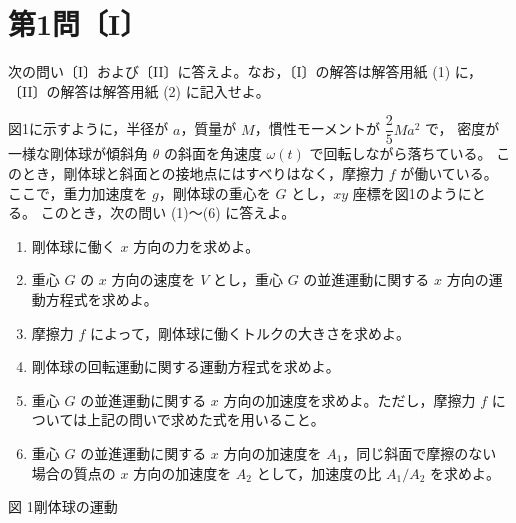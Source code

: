 \section*{第1問〔I〕}

次の問い〔I〕および〔II〕に答えよ。なお，〔I〕の解答は解答用紙 (1) に，
〔II〕の解答は解答用紙 (2) に記入せよ。

\medskip
図1に示すように，半径が $a$，質量が $M$，慣性モーメントが $\dfrac{2}{5}Ma^2$ で，
密度が一様な剛体球が傾斜角 $\theta$ の斜面を角速度 $\omega(t)$ で回転しながら落ちている。
このとき，剛体球と斜面との接地点にはすべりはなく，摩擦力 $f$ が働いている。
ここで，重力加速度を $g$，剛体球の重心を $G$ とし，$xy$ 座標を図1のようにとる。
このとき，次の問い (1)〜(6) に答えよ。

\begin{enumerate}[label=(\arabic*)]
  \item 剛体球に働く $x$ 方向の力を求めよ。
  \item 重心 $G$ の $x$ 方向の速度を $V$ とし，重心 $G$ の並進運動に関する
        $x$ 方向の運動方程式を求めよ。
  \item 摩擦力 $f$ によって，剛体球に働くトルクの大きさを求めよ。
  \item 剛体球の回転運動に関する運動方程式を求めよ。
  \item 重心 $G$ の並進運動に関する $x$ 方向の加速度を求めよ。ただし，摩擦力 $f$ に
        ついては上記の問いで求めた式を用いること。
  \item 重心 $G$ の並進運動に関する $x$ 方向の加速度を $A_1$，同じ斜面で摩擦のない
        場合の質点の $x$ 方向の加速度を $A_2$ として，加速度の比 $A_1/A_2$ を求めよ。
\end{enumerate}

\begin{center}

{\small 図 1\quad 剛体球の運動}
\end{center}
